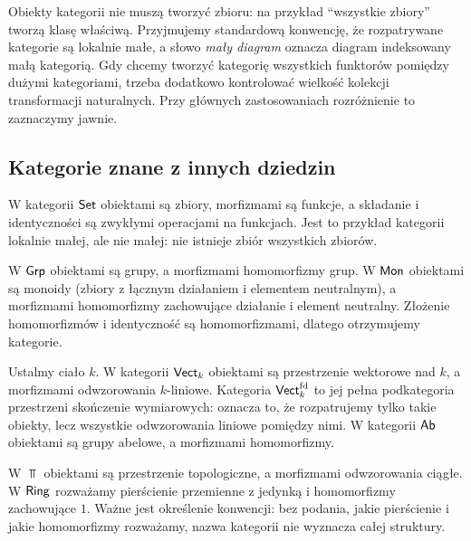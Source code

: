 \begin{uwaga}
Obiekty kategorii nie muszą tworzyć zbioru: na przykład ``wszystkie zbiory'' tworzą klasę właściwą. Przyjmujemy standardową konwencję, że rozpatrywane kategorie są lokalnie małe, a słowo \emph{mały diagram} oznacza diagram indeksowany małą kategorią. Gdy chcemy tworzyć kategorię wszystkich funktorów pomiędzy dużymi kategoriami, trzeba dodatkowo kontrolować wielkość kolekcji transformacji naturalnych. Przy głównych zastosowaniach rozróżnienie to zaznaczymy jawnie.
\end{uwaga}


\subsection{Kategorie znane z innych dziedzin}

\begin{przyklad}[Zbiory]
W kategorii $\mathsf{Set}$ obiektami są zbiory, morfizmami są funkcje, a składanie i identyczności są zwykłymi operacjami na funkcjach. Jest to przykład kategorii lokalnie małej, ale nie małej: nie istnieje zbiór wszystkich zbiorów.
\end{przyklad}

\begin{przyklad}
W $\mathsf{Grp}$ obiektami są grupy, a morfizmami homomorfizmy grup. W $\mathsf{Mon}$ obiektami są monoidy (zbiory z łącznym działaniem i elementem neutralnym), a morfizmami homomorfizmy zachowujące działanie i element neutralny. Złożenie homomorfizmów i identyczność są homomorfizmami, dlatego otrzymujemy kategorie.
\end{przyklad}

\begin{przyklad}
Ustalmy ciało $k$. W kategorii $\mathsf{Vect}_k$ obiektami są przestrzenie wektorowe nad $k$, a morfizmami odwzorowania $k$-liniowe. Kategoria $\mathsf{Vect}_k^{\mathrm{fd}}$ to jej pełna podkategoria przestrzeni skończenie wymiarowych: oznacza to, że rozpatrujemy tylko takie obiekty, lecz wszystkie odwzorowania liniowe pomiędzy nimi. W kategorii $\mathsf{Ab}$ obiektami są grupy abelowe, a morfizmami homomorfizmy.
\end{przyklad}

\begin{przyklad}
W $\Top$ obiektami są przestrzenie topologiczne, a morfizmami odwzorowania ciągłe. W $\mathsf{Ring}$ rozważamy pierścienie przemienne z jedynką i homomorfizmy zachowujące $1$. Ważne jest określenie konwencji: bez podania, jakie pierścienie i jakie homomorfizmy rozważamy, nazwa kategorii nie wyznacza całej struktury.
\end{przyklad}

